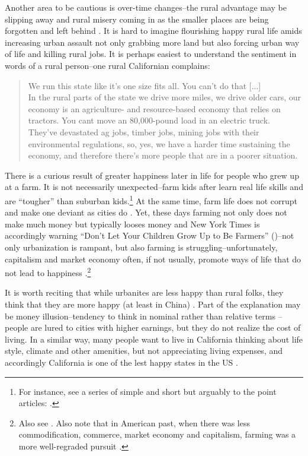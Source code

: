\documentclass[10pt, letterpaper]{article}
\begin{document}
\begin{spacing}{2.0}
Another area to be cautious is over-time changes--the rural advantage may be
slipping away and rural misery coming in as the smaller places are being
forgotten and left behind
\citep{aok-misanthropy-trustCity,aok-swbGenYcity18,hansonCityJournalautumn15}. It
is hard to imagine flourishing happy rural life amids increasing urban assault
not only grabbing more land but also forcing urban way of life and killing rural
jobs. It is perhaps easiest to understand the sentiment in words of a rural person--one rural
Californian complains: 

\begin{quote}
  We run this state like it's one size fits all. You can't do that [...]\\
In the rural parts of the state we drive more miles, we drive older cars, our
economy is an agriculture- and resource-based economy that relies on tractors.
 You cant move an 80,000-pound load in an electric truck.\\
They've devastated ag jobs, timber jobs, mining jobs with their environmental
regulations, so, yes, we have a harder time sustaining the economy, and
therefore there's more people that are in a poorer situation. \citep{fullerNYT17monD}
\end{quote}

There is a curious result of greater happiness later in life for people who grew
up at a farm. It is not necessarily unexpected--farm kids after learn real life
skills and are ``tougher'' than suburban kids.\footnote{For instance, see a series of
simple and short but arguably to the point articles:
 \citet{FFP14aug13,FFP14dec16,FFP14oct20}.}  At the same time, farm life does not corrupt and make one deviant as cities do
 \citep{wirth38,park84}. Yet, these days farming not only does not make much money but
 typically looses money and New York Times is accordingly warning ``Don't Let
 Your Children Grow Up to Be Farmers'' (\citeyear{smithNYT17aug9})--not only urbanization is
 rampant, but also farming is struggling--unfortunately, capitalism and
 market economy often, if not usually, promote ways of life that do not lead to
 happiness \citep{kasser13,marcuse15,lane00,scitovsky76,klein14}.\footnote{Also see \citet{kasser93,schmuck00,okulicz17B,harvey14,harvey16,stefanSS10may,vohs06,schor08,engels87,lamothe16}. Also note that in
 American past, when there was less commodification, commerce, market economy
 and capitalism, farming was a more well-regraded pursuit \citep{deCrevecoeur81,fischer91}.}

It is worth reciting that while urbanites are less happy than rural folks, they
think that they are more happy (at least in China) \citep{knight10}.
Part of the explanation may be money illusion--tendency to think in nominal
rather than relative terms \citep{shafir97al}--people are lured to cities with
higher earnings, but they do not realize the cost of living. In a similar way,
many people want to live in California thinking about life style, climate and
other amenities, but not appreciating living expenses, and accordingly
California is one of the lest happy states in the US \citep{oswald09w,schkade98k}.


\end{spacing}
\end{document}
